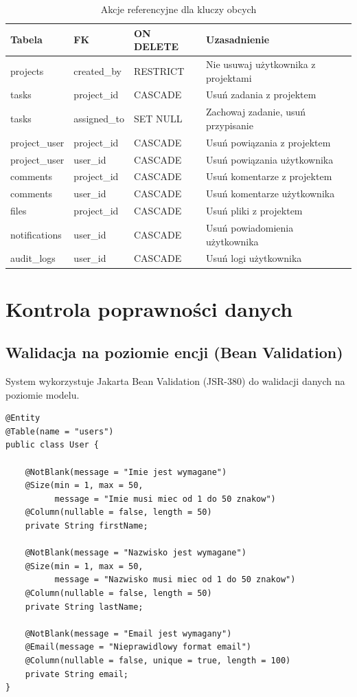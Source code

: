 \documentclass[12pt,a4paper]{report}
\begin{document}
\begin{table}[H]
\centering
\caption{Akcje referencyjne dla kluczy obcych}
\begin{tabular}{|l|l|l|l|}
\hline
\textbf{Tabela} & \textbf{FK} & \textbf{ON DELETE} & \textbf{Uzasadnienie} \\
\hline
projects & created\_by & RESTRICT & Nie usuwaj użytkownika z projektami \\
tasks & project\_id & CASCADE & Usuń zadania z projektem \\
tasks & assigned\_to & SET NULL & Zachowaj zadanie, usuń przypisanie \\
project\_user & project\_id & CASCADE & Usuń powiązania z projektem \\
project\_user & user\_id & CASCADE & Usuń powiązania użytkownika \\
comments & project\_id & CASCADE & Usuń komentarze z projektem \\
comments & user\_id & CASCADE & Usuń komentarze użytkownika \\
files & project\_id & CASCADE & Usuń pliki z projektem \\
notifications & user\_id & CASCADE & Usuń powiadomienia użytkownika \\
audit\_logs & user\_id & CASCADE & Usuń logi użytkownika \\
\hline
\end{tabular}
\end{table}

\chapter{Kontrola poprawności danych}

\section{Walidacja na poziomie encji (Bean Validation)}

System wykorzystuje Jakarta Bean Validation (JSR-380) do walidacji danych na poziomie modelu.

\begin{lstlisting}[style=javastyle, caption={Walidacja w encji User}]
@Entity
@Table(name = "users")
public class User {

    @NotBlank(message = "Imie jest wymagane")
    @Size(min = 1, max = 50, 
          message = "Imie musi miec od 1 do 50 znakow")
    @Column(nullable = false, length = 50)
    private String firstName;

    @NotBlank(message = "Nazwisko jest wymagane")
    @Size(min = 1, max = 50, 
          message = "Nazwisko musi miec od 1 do 50 znakow")
    @Column(nullable = false, length = 50)
    private String lastName;

    @NotBlank(message = "Email jest wymagany")
    @Email(message = "Nieprawidlowy format email")
    @Column(nullable = false, unique = true, length = 100)
    private String email;
}
\end{lstlisting}
\end{document}
